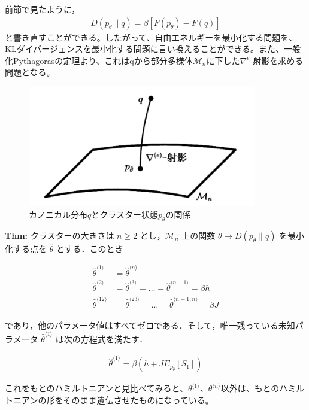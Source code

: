 \documentclass[a4paper,11pt]{jsarticle}
\numberwithin{equation}{section}
\begin{document}
前節で見たように，
\begin{align}
D(p_\theta \| q) = \beta \left[ F(p_\theta) - F(q) \right]
\end{align}
と書き直すことができる。したがって、自由エネルギーを最小化する問題を、KLダイバージェンスを最小化する問題に言い換えることができる。また、一般化Pythagorasの定理より、これはqから部分多様体$\mathcal{M}_n$に下した$\nabla^e$-射影を求める問題となる。\\
\begin{figure}[H]
    \begin{center}
    \includegraphics[width=100mm]{ising.png}
    \end{center}
    \caption{カノニカル分布$q$とクラスター状態$p_{\theta}$の関係}
    \label{fig:a}
\end{figure}

\begin{itembox}[l]{\textbf{Thm:}}
    クラスターの大きさは $n \geq 2$ とし，$\mathcal{M}_n$ 上の関数 $\theta \mapsto D(p_\theta \| q)$ を最小化する点を $\hat{\theta}$ とする．このとき

\begin{align}
\hat{\theta}^{\langle 1 \rangle} &= \hat{\theta}^{\langle n \rangle} \\
\hat{\theta}^{\langle 2 \rangle} &= \hat{\theta}^{\langle 3 \rangle} = \dots = \hat{\theta}^{\langle n-1 \rangle} = \beta h \\
\hat{\theta}^{\langle 12 \rangle} &= \hat{\theta}^{\langle 23 \rangle} = \dots = \hat{\theta}^{\langle n-1,n \rangle} = \beta J
\end{align}

であり，他のパラメータ値はすべてゼロである．そして，唯一残っている未知パラメータ $\hat{\theta}^{\langle 1 \rangle}$ は次の方程式を満たす．

\begin{align}
\hat{\theta}^{\langle 1 \rangle} = \beta \left( h + J E_{p_{\hat{\theta}}} \left[ S_1 \right] \right)
\end{align}
\end{itembox}
これをもとのハミルトニアンと見比べてみると、$\theta^{\langle 1 \rangle}、\theta^{\langle n \rangle}$以外は、もとのハミルトニアンの形をそのまま遺伝させたものになっている。
\end{document}
